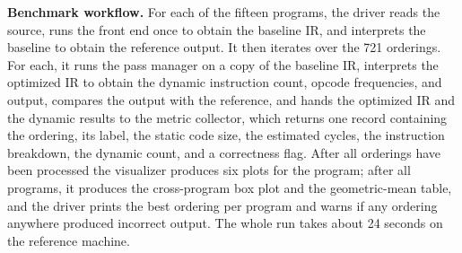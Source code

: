\textbf{Benchmark workflow.} For each of the fifteen programs, the driver reads the source, runs the front end once to obtain the baseline IR, and interprets the baseline to obtain the reference output. It then iterates over the 721 orderings. For each, it runs the pass manager on a copy of the baseline IR, interprets the optimized IR to obtain the dynamic instruction count, opcode frequencies, and output, compares the output with the reference, and hands the optimized IR and the dynamic results to the metric collector, which returns one record containing the ordering, its label, the static code size, the estimated cycles, the instruction breakdown, the dynamic count, and a correctness flag. After all orderings have been processed the visualizer produces six plots for the program; after all programs, it produces the cross-program box plot and the geometric-mean table, and the driver prints the best ordering per program and warns if any ordering anywhere produced incorrect output. The whole run takes about 24 seconds on the reference machine.

